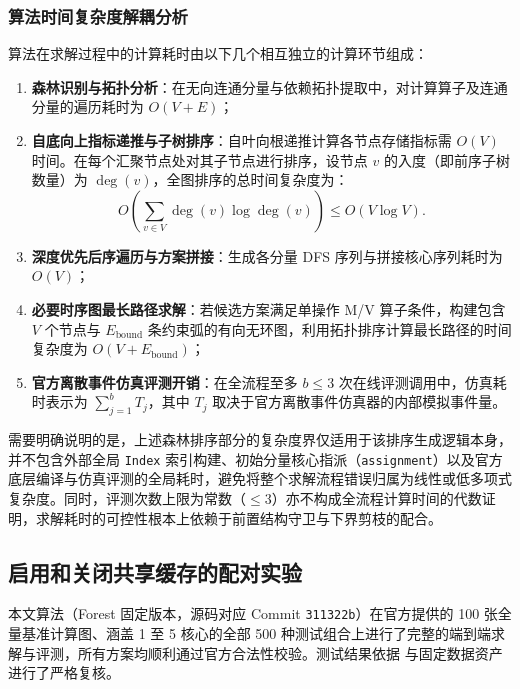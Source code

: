 \documentclass[anonymous,notoc]{gmcm2026}
\providecommand{\tightlist}{\setlength{\itemsep}{0pt}\setlength{\parskip}{0pt}}
\begin{document}
\subsubsection{算法时间复杂度解耦分析}

算法在求解过程中的计算耗时由以下几个相互独立的计算环节组成：

\begin{enumerate}
\def\labelenumi{\arabic{enumi}.}
\tightlist
\item
  \textbf{森林识别与拓扑分析}：在无向连通分量与依赖拓扑提取中，对计算算子及连通分量的遍历耗时为 \(O(V + E)\)；
\item
  \textbf{自底向上指标递推与子树排序}：自叶向根递推计算各节点存储指标需 \(O(V)\) 时间。在每个汇聚节点处对其子节点进行排序，设节点 \(v\) 的入度（即前序子树数量）为 \(\deg(v)\)，全图排序的总时间复杂度为： \begin{equation}
O\left( \sum_{v \in V} \deg(v) \log \deg(v) \right) \le O(V \log V).
\end{equation}
\item
  \textbf{深度优先后序遍历与方案拼接}：生成各分量 DFS 序列与拼接核心序列耗时为 \(O(V)\)；
\item
  \textbf{必要时序图最长路径求解}：若候选方案满足单操作 M/V 算子条件，构建包含 \(V\) 个节点与 \(E_{\mathrm{bound}}\) 条约束弧的有向无环图，利用拓扑排序计算最长路径的时间复杂度为 \(O(V + E_{\mathrm{bound}})\)；
\item
  \textbf{官方离散事件仿真评测开销}：在全流程至多 \(b \le 3\) 次在线评测调用中，仿真耗时表示为 \(\sum_{j=1}^b T_j\)，其中 \(T_j\) 取决于官方离散事件仿真器的内部模拟事件量。
\end{enumerate}

需要明确说明的是，上述森林排序部分的复杂度界仅适用于该排序生成逻辑本身，并不包含外部全局 \texttt{Index} 索引构建、初始分量核心指派（\texttt{assignment}）以及官方底层编译与仿真评测的全局耗时，避免将整个求解流程错误归属为线性或低多项式复杂度。同时，评测次数上限为常数（\(\le 3\)）亦不构成全流程计算时间的代数证明，求解耗时的可控性根本上依赖于前置结构守卫与下界剪枝的配合。

\subsection{启用和关闭共享缓存的配对实验}

本文算法（Forest 固定版本，源码对应 Commit \texttt{311322b}）在官方提供的 100 张全量基准计算图、涵盖 1 至 5 核心的全部 500 种测试组合上进行了完整的端到端求解与评测，所有方案均顺利通过官方合法性校验。测试结果依据 \texttt{} 与固定数据资产进行了严格复核。
\end{document}
